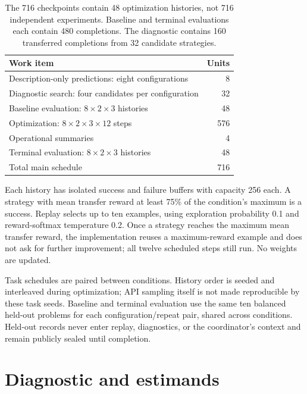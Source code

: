 \documentclass[11pt]{article}
\begin{document}
\begin{table}[ht]
\centering
\begin{tabular}{@{}lr@{}}
\toprule
Work item & Units\\\midrule
Description-only predictions: eight configurations & 8\\
Diagnostic search: four candidates per configuration & 32\\
Baseline evaluation: $8\times2\times3$ histories & 48\\
Optimization: $8\times2\times3\times12$ steps & 576\\
Operational summaries & 4\\
Terminal evaluation: $8\times2\times3$ histories & 48\\\midrule
Total main schedule & 716\\\bottomrule
\end{tabular}
\caption{The 716 checkpoints contain 48 optimization histories, not 716 independent experiments. Baseline and terminal evaluations each contain 480 completions. The diagnostic contains 160 transferred completions from 32 candidate strategies.}\label{tab:schedule}
\end{table}

Each history has isolated success and failure buffers with capacity 256 each. A strategy with mean transfer reward at least 75\% of the condition's maximum is a success. Replay selects up to ten examples, using exploration probability 0.1 and reward-softmax temperature 0.2. Once a strategy reaches the maximum mean transfer reward, the implementation reuses a maximum-reward example and does not ask for further improvement; all twelve scheduled steps still run. No weights are updated.

Task schedules are paired between conditions. History order is seeded and interleaved during optimization; API sampling itself is not made reproducible by these task seeds. Baseline and terminal evaluation use the same ten balanced held-out problems for each configuration/repeat pair, shared across conditions. Held-out records never enter replay, diagnostics, or the coordinator's context and remain publicly sealed until completion.

\section{Diagnostic and estimands}
\end{document}
